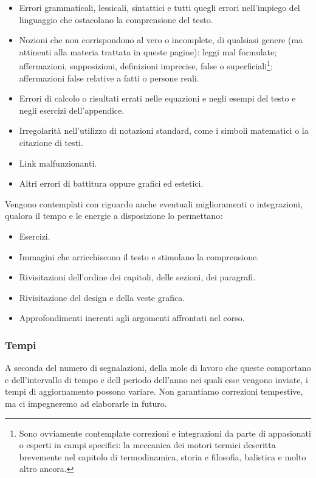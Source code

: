 \begin{itemize}
    \item Errori grammaticali, lessicali, sintattici e tutti quegli errori nell'impiego
    del linguaggio che ostacolano la comprensione del testo.

    \item Nozioni che non corrispondono al vero o incomplete, di qualsiasi genere (ma
    attinenti alla materia trattata in queste pagine):
    leggi mal formulate; affermazioni, supposizioni, definizioni imprecise, false o
    superficiali\footnote{Sono ovviamente contemplate correzioni e integrazioni da parte di appasionati
    o esperti in campi specifici: la meccanica dei motori termici descritta brevemente
    nel capitolo di termodinamica, storia e filosofia, balistica e molto altro ancora.}; affermazioni false
    relative a fatti o persone reali.

    \item Errori di calcolo o risultati errati nelle equazioni e negli esempi del testo e negli
    esercizi dell'appendice.

    \item Irregolarità nell'utilizzo di notazioni standard, come i simboli matematici
    o la citazione di testi.

    \item Link malfunzionanti.
    
    \item Altri errori di battitura oppure grafici ed estetici.
\end{itemize}

Vengono contemplati con riguardo anche eventuali miglioramenti o integrazioni,
qualora il tempo e le energie a disposizione lo permettano:

\begin{itemize}
    \item Esercizi.
    \item Immagini che arricchiscono il testo e stimolano la comprensione.
    \item Rivisitazioni dell'ordine dei capitoli, delle sezioni, dei paragrafi.
    \item Rivisitazione del design e della veste grafica.
    \item Approfondimenti inerenti agli argomenti affrontati nel corso.
\end{itemize}

\subsubsection*{Tempi}
A seconda del numero di segnalazioni, della mole di lavoro che queste
comportano e dell'intervallo di tempo e dell periodo dell'anno nei quali
esse vengono inviate, i tempi di aggiornamento possono variare. Non
garantiamo correzioni tempestive, ma ci impegneremo ad elaborarle in
futuro.